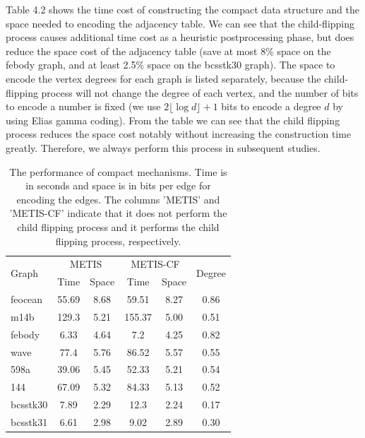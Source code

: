 \documentclass[12pt,glossary]{dalthesis}
\begin{document}
\bigskip
\bigskip


Table 4.2 shows the time cost of constructing the compact data structure and the space needed to encoding the adjacency table. We can see that the child-flipping process causes additional time cost as a heuristic postprocessing phase, but does reduce the space cost of the adjacency table (save at most 8\% space on the febody graph, and at least 2.5\% space on the bcsstk30 graph). The space to encode the vertex degrees for each graph is listed separately, because the child-flipping process will not change the degree of each vertex, and the number of bits to encode a number is fixed (we use $2\lfloor \log d \rfloor + 1$ bits to encode a degree $d$ by using Elias gamma coding). From the table we can see that the child flipping process reduces the space cost notably without increasing the construction time greatly. Therefore, we always perform this process in subsequent studies. 

\begin{table}[]
\centering
\caption{The performance of compact mechanisms. Time is in seconds and space is in bits per edge for encoding the edges. The columns 'METIS' and 'METIS-CF' indicate that it does not perform the child flipping process and it performs the child flipping process, respectively.}
\label{compact-performance}
\begin{tabular}{|l||c|c||c|c||c|}
\cline{2-6}
\hline
\multirow{2}{*}{Graph} & \multicolumn{2}{c||}{METIS} & \multicolumn{2}{c||}{METIS-CF} & \multirow{2}{*}{Degree} \\ \cline{2-5}
                       & Time          & Space        & Time           & Space         &                         \\ \cline{6-6} \hline
feocean                & 55.69         & 8.68         & 59.51          & 8.27          & 0.86                    \\
m14b                   & 129.3         & 5.21         & 155.37         & 5.00          & 0.51                    \\
febody                 & 6.33          & 4.64         & 7.2            & 4.25          & 0.82                    \\
wave                   & 77.4          & 5.76         & 86.52          & 5.57          & 0.55                    \\
598a                   & 39.06         & 5.45         & 52.33          & 5.21          & 0.54                    \\
144                    & 67.09         & 5.32         & 84.33          & 5.13          & 0.52                    \\
bcsstk30               & 7.89          & 2.29         & 12.3           & 2.24          & 0.17                    \\
bcsstk31               & 6.61          & 2.98         & 9.02           & 2.89          & 0.30                    \\ \hline
\end{tabular}
\end{table}
\end{document}
